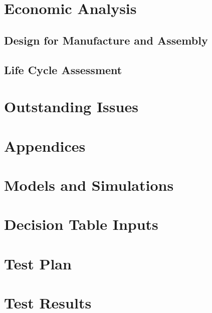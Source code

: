 \documentclass{article}
\begin{document}
\section{Economic Analysis}

\subsection{Design for Manufacture and Assembly}

\subsection{Life Cycle Assessment}

\section{Outstanding Issues}


\section{\bf{Appendices}}
\section{Models and Simulations}

\section{Decision Table Inputs}

\section{Test Plan}

\section{Test Results}
\end{document}
